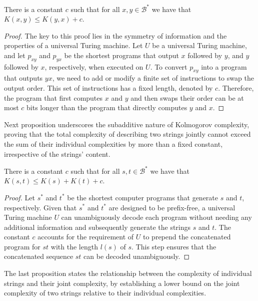 \begin{proposition}
\label{prop:kolmogorov_order}
There is a constant $c$ such that for all $x, y \in\mathcal{B}^{\ast}$ we have that $K(x, y) \leq K(y, x) + c$.
\end{proposition}
\begin{proof}
The key to this proof lies in the symmetry of information and the properties of a universal Turing machine. Let $U$ be a universal Turing machine, and let $p_{xy}$ and $p_{yx}$ be the shortest programs that output $x$ followed by $y$, and $y$ followed by $x$, respectively, when executed on $U$. To convert $p_{xy}$ into a program that outputs $yx$, we need to add or modify a finite set of instructions to swap the output order. This set of instructions has a fixed length, denoted by $c$. Therefore, the program that first computes $x$ and $y$ and then swaps their order can be at most $c$ bits longer than the program that directly computes $y$ and $x$.
\end{proof}

Next proposition underscores the subadditive nature of Kolmogorov complexity, proving that the total complexity of describing two strings jointly cannot exceed the sum of their individual complexities by more than a fixed constant, irrespective of the strings' content.

\begin{proposition}
\label{prop:additive_kolmogorov}
There is a constant $c$ such that for all $s, t \in\mathcal{B}^{\ast}$ we have that $K(s, t) \leq K(s) + K(t) + c$.
\end{proposition}
\begin{proof}
Let $s^\ast$ and $t^\ast$ be the shortest computer programs that generate $s$ and $t$, respectively. Given that $s^\ast$ and $t^\ast$ are designed to be prefix-free, a universal Turing machine $U$ can unambiguously decode each program without needing any additional information and subsequently generate the strings $s$ and $t$. The constant $c$ accounts for the requirement of $U$ to prepend the concatenated program for $st$ with the length $l(s)$ of $s$. This step ensures that the concatenated sequence $st$ can be decoded unambiguously.
\end{proof}

The last proposition states the relationship between the complexity of individual strings and their joint complexity, by establishing a lower bound on the joint complexity of two strings relative to their individual complexities.

